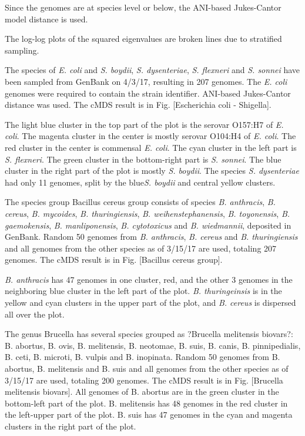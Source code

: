 \documentclass[10pt,a4paper]{article}
\begin{document}
Since the genomes are at species level or below, the ANI-based Jukes-Cantor model distance is used.

The log-log plots of the squared eigenvalues are broken lines due to stratified sampling. 



The species of {\it E. coli} and {\it S. boydii}, {\it S. dysenteriae}, {\it S. flexneri} and {\it S. sonnei} have been sampled from GenBank on 4/3/17, resulting in 207 genomes. 
The {\it E. coli} genomes were required to contain the strain identifier.
ANI-based Jukes-Cantor distance was used. 
The cMDS result is in Fig. [Escherichia coli - Shigella]. 

The light blue cluster in the top part of the plot is the serovar O157:H7 of {\it E. coli}. 
The magenta cluster in the center is mostly serovar O104:H4 of {\it E. coli}. 
The red cluster in the center is commensal {\it E. coli}. 
The cyan cluster in the left part is {\it S. flexneri}. 
The green cluster in the bottom-right part is {\it S. sonnei}. 
The blue cluster in the right part of the plot is mostly {\it S. boydii}. 
The species {\it S. dysenteriae} had only 11 genomes, split by the blue{\it  S. boydii} and central yellow clusters.



The species group Bacillus cereus group consists of species 
{\it B. anthracis}, 
{\it B. cereus}, 
{\it B. mycoides}, 
{\it B. thuringiensis}, 
{\it B. weihenstephanensis}, 
{\it B. toyonensis}, 
{\it B. gaemokensis}, 
{\it B. manliponensis}, 
{\it B. cytotoxicus}
and {\it B. wiedmannii}, 
deposited in GenBank. 
Random 50 genomes from {\it B. anthracis}, {\it B. cereus} and {\it B. thuringiensis} 
and all genomes from the other species as of 3/15/17 are used, totaling 207 genomes. 
The cMDS result is in Fig. [Bacillus cereus group].

{\it B. anthracis} has 47 genomes in one cluster, red, and the other 3 genomes in the neighboring blue cluster in the left part of the plot. 
{\it B. thuringeinsis} is in the yellow and cyan clusters in the upper part of the plot, 
and {\it B. cereus} is dispersed all over the plot.



The genus Brucella has several species grouped as ?Brucella melitensis biovars?: B. abortus, B. ovis, B. melitensis, B. neotomae, B. suis, B. canis, B. pinnipedialis, B. ceti, B. microti, B. vulpis and B. inopinata.
Random 50 genomes from B. abortus, B. melitensis and B. suis and all genomes from the other species as of 3/15/17 are used, totaling 200 genomes. The cMDS result is in Fig. [Brucella melitensis biovars].
All genomes of B. abortus are in the green cluster in the bottom-left part of the plot. B. melitensis has 48 genomes in the red cluster in the left-upper part of the plot. B. suis has 47 genomes in the cyan and magenta clusters in the right part of the plot.
\end{document}
